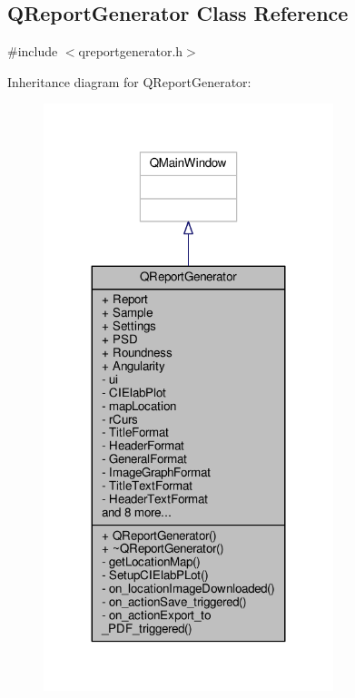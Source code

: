 \hypertarget{class_q_report_generator}{}\subsection{Q\+Report\+Generator Class Reference}
\label{class_q_report_generator}


{\ttfamily \#include $<$qreportgenerator.\+h$>$}



Inheritance diagram for Q\+Report\+Generator\+:
\nopagebreak
\begin{figure}[H]
\begin{center}
\leavevmode
\includegraphics[width=239pt]{class_q_report_generator__inherit__graph}
\end{center}
\end{figure}



